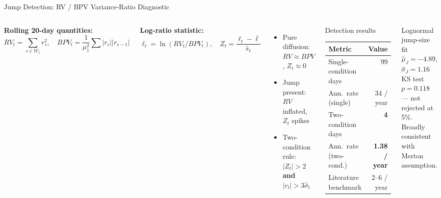 \documentclass[aspectratio=169,10pt]{beamer}
\begin{document}
\begin{frame}{Jump Detection: RV / BPV Variance-Ratio Diagnostic}
\begin{columns}[T]
{\small\textbf{Rolling 20-day quantities:}}
{\small\[
RV_t = \sum_{s\in\mathcal{W}_t}r_s^2,\quad
BPV_t = \frac{1}{\mu_1^2}\sum|r_s||r_{s-1}|
\]}

{\small\textbf{Log-ratio statistic:}}
{\small\[
\ell_t = \ln(RV_t / BPV_t),\quad
Z_t = \frac{\ell_t - \bar\ell}{\hat s_\ell}
\]}
{\footnotesize
\begin{itemize}\itemsep1pt
  \item Pure diffusion: $RV\approx BPV$, $Z_t\approx 0$
  \item Jump present: $RV$ inflated, $Z_t$ spikes
  \item Two-condition rule: $|Z_t|>2$ \textbf{and} $|r_t|>3\hat\sigma_t$
\end{itemize}}

\begin{block}{Detection results}
\footnotesize
\begin{tabular}{lr}
\toprule
Metric & Value \\
\midrule
Single-condition days & 99 \\
Ann.\ rate (single) & 34 / year \\
Two-condition days & \textbf{4} \\
Ann.\ rate (two-cond.) & \textbf{1.38 / year} \\
Literature benchmark & 2--6 / year \\
\bottomrule
\end{tabular}
\end{block}

\begin{block}{Lognormal jump-size fit}
\footnotesize $\hat\mu_J = -4.89$, $\hat\sigma_J = 1.16$\\
KS test $p = 0.118$ --- not rejected at 5\%.\\
Broadly consistent with Merton assumption.
\end{block}
\end{columns}
\end{frame}
\end{document}
